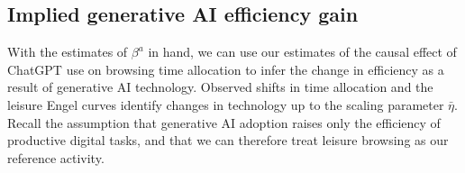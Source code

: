 \documentclass[12pt]{article}
\begin{document}

\subsection{Implied generative AI efficiency gain} \label{subsec:efficiency_gain}

With the estimates of $\beta^a$ in hand, we can use our estimates of the causal effect of ChatGPT use on browsing time allocation to infer the change in efficiency as a result of generative AI technology. Observed shifts in time allocation and the leisure Engel curves identify changes in technology up to the scaling parameter $\bar{\eta}$. Recall the assumption that generative AI adoption raises only the efficiency of productive digital tasks, and that we can therefore treat leisure browsing as our reference activity.
\end{document}

